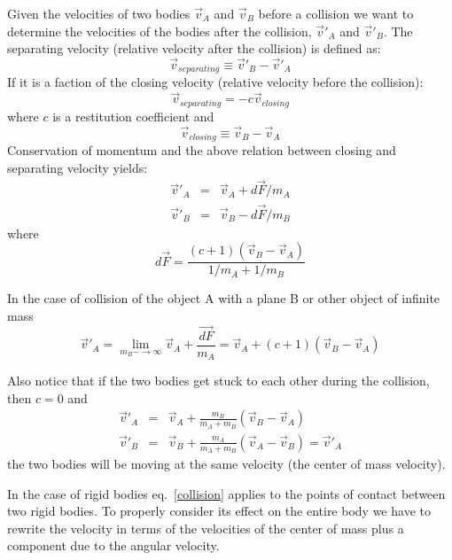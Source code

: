 \documentclass[12pt]{article}
\begin{document}
Given the velocities of two bodies $\vec v_A$ and $\vec v_B$ before a collision we want to determine the velocities of the bodies after the collision, $\vec v'_A$ and $\vec v'_B$. The separating velocity (relative velocity after the collision) is defined as:
\begin{equation}
\vec v_{separating} \equiv \vec v'_B - \vec v'_A
\end{equation}
If it is a faction of the closing velocity (relative velocity before the collision):
\begin{equation}
\vec v_{separating} = -c \vec v_{closing}
\label{collision}
\end{equation}
where $c$ is a restitution coefficient and 
\begin{equation}
\vec v_{closing} \equiv \vec v_B - \vec v_A
\end{equation}
Conservation of momentum and the above relation between closing and separating velocity yields:
\begin{eqnarray}
\vec v'_A &=& \vec v_A + d{\vec F}/{m_A} \\
\vec v'_B &=& \vec v_B - d{\vec F}/{m_B} 
\end{eqnarray}
where
\begin{equation}
d{\vec F} = \frac{(c+1)(\vec v_B-\vec v_A)}{1/m_A+1/m_B}
\end{equation}

In the case of collision of the object A with a plane B or other object of infinite mass
\begin{equation}
\vec v'_A = \lim_{m_B-\rightarrow \infty} \vec v_A + \frac{\vec{dF}}{m_A} = \vec v_A + (c+1)(\vec v_B-\vec v_A)
\end{equation}

Also notice that if the two bodies get stuck to each other during the collision, then $c=0$ and
\begin{eqnarray}
\vec v'_A &=& \vec v_A + \frac{m_B}{m_A+m_B}(\vec v_B-\vec v_A) \\
\vec v'_B &=& \vec v_B + \frac{m_A}{m_A+m_B}(\vec v_A-\vec v_B) = \vec v'_A
\end{eqnarray}
the two bodies will be moving at the same velocity (the center of mass velocity).

In the case of rigid bodies eq.~\ref{collision} applies to the points of contact between two rigid bodies. To properly consider its effect on the entire body we have to rewrite the velocity in terms of the velocities of the center of mass plus a component due to the angular velocity.
\end{document}
